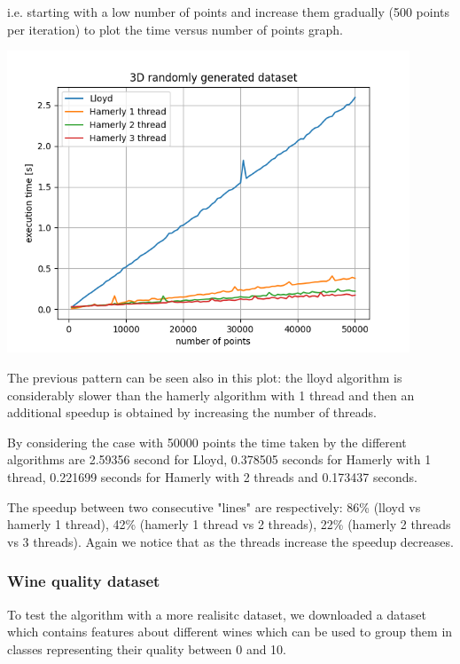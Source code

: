 \documentclass{report}
\begin{document}
\begin{minipage}[b]{0.48\textwidth}
  i.e. starting  with a low number of points and increase them gradually (500 points per iteration) to plot the time versus number of points graph.

  \begin{center} 
    \includegraphics[width = 0.9\textwidth]{imgs/lh123_3Drnd.png}
    \label{fig:lh123_3Drnd}
  \end{center}

  The previous pattern can be seen also in this plot: the lloyd algorithm is considerably slower than the hamerly algorithm with 1 thread and then an additional speedup is obtained by increasing the number of threads.

  By considering the case with 50000 points the time taken by the different algorithms are 2.59356 second for Lloyd, 0.378505 seconds for Hamerly with 1 thread, 0.221699 seconds for Hamerly with 2 threads and 0.173437 seconds.

  The speedup between two consecutive "lines" are respectively: 86\% (lloyd vs hamerly 1 thread), 42\% (hamerly 1 thread vs 2 threads), 22\% (hamerly 2 threads vs 3 threads). Again we notice that as the threads increase the speedup decreases.

  \subsubsection*{Wine quality dataset}
  To test the algorithm with a more realisitc dataset, we downloaded a dataset which contains features about different wines which can be used to group them in classes representing their quality between 0 and 10.


\end{minipage}
\end{document}
